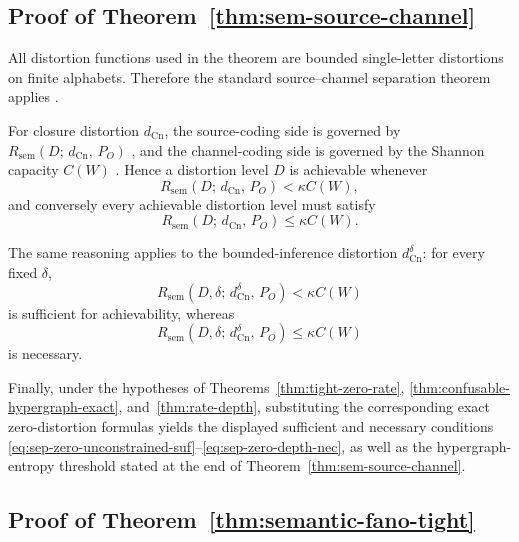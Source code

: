 \documentclass[journal,onecolumn]{IEEEtran}
\makeatletter
\newcommand{\Cn}{\text{Cn}}
\numberwithin{equation}{section}
\renewenvironment{proof}[1][\proofname]{\par
  \pushQED{\qed}%
  \normalfont \topsep6\p@\@plus6\p@\relax
  \trivlist
  \item[\hskip\labelsep
        \itshape
    #1\@addpunct{.}]\ignorespaces
}{%
  \popQED\endtrivlist\@endpefalse
}
\makeatother
\begin{document}
\subsection{Proof of Theorem~\ref{thm:sem-source-channel}}
\label{app:proof-separation}

\begin{proof}
All distortion functions used in the theorem are bounded
single-letter distortions on finite alphabets.
Therefore the standard source--channel separation theorem applies \cite[Chs.~7,10]{cover2006elements}
\cite[Ch.~7]{csiszar2011information}.

For closure distortion \(d_{\Cn}\), the source-coding side is governed
by \(R_{\mathrm{sem}}(D;\,d_{\Cn},\,P_O)\)\cite[Ch.~10]{cover2006elements}
\cite[Ch.~7]{csiszar2011information}, and the channel-coding
side is governed by the Shannon capacity \(C(W)\)\cite[Ch.~7]{cover2006elements}
\cite[Ch.~6]{csiszar2011information}.
Hence a distortion level \(D\) is achievable whenever
\[
  R_{\mathrm{sem}}(D;\,d_{\Cn},\,P_O)<\kappa C(W),
\]
and conversely every achievable distortion level must satisfy
\[
  R_{\mathrm{sem}}(D;\,d_{\Cn},\,P_O)\le \kappa C(W).
\]

The same reasoning applies to the bounded-inference distortion
\(d_{\Cn}^{\delta}\): for every fixed \(\delta\),
\[
  R_{\mathrm{sem}}(D,\delta;\,d_{\Cn}^{\delta},\,P_O)
  < \kappa C(W)
\]
is sufficient for achievability, whereas
\[
  R_{\mathrm{sem}}(D,\delta;\,d_{\Cn}^{\delta},\,P_O)
  \le \kappa C(W)
\]
is necessary.

Finally, under the hypotheses of
Theorems~\ref{thm:tight-zero-rate}, \ref{thm:confusable-hypergraph-exact},
and~\ref{thm:rate-depth}, substituting the corresponding exact
zero-distortion formulas yields the displayed sufficient and necessary
conditions \eqref{eq:sep-zero-unconstrained-suf}--\eqref{eq:sep-zero-depth-nec},
as well as the hypergraph-entropy threshold stated at the end of
Theorem~\ref{thm:sem-source-channel}.
\end{proof}

\subsection{Proof of Theorem~\ref{thm:semantic-fano-tight}}
\label{app:proof-semantic-fano-tight}
\end{document}
